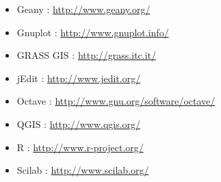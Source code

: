 \begin{itemize}
  \item Geany : \textcolor{blue}{\url{http://www.geany.org/}}
  \item Gnuplot : \textcolor{blue}{\url{http://www.gnuplot.info/}}
  \item GRASS GIS : \textcolor{blue}{\url{http://grass.itc.it/}}
  \item jEdit : \textcolor{blue}{\url{http://www.jedit.org/}}
  \item Octave : \textcolor{blue}{\url{http://www.gnu.org/software/octave/}}
  \item QGIS : \textcolor{blue}{\url{http://www.qgis.org/}}
  \item R : \textcolor{blue}{\url{http://www.r-project.org/}}
  \item Scilab : \textcolor{blue}{\url{http://www.scilab.org/}} 
\end{itemize}   

